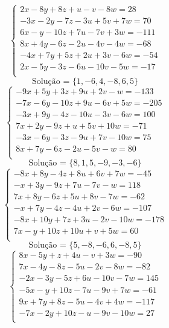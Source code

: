 \documentclass[12pt,oneside,a4paper]{article}
\begin{document}
\vspace{\baselineskip}
\begin{equation*}
\begin{cases}
2x-8y+8z+u-v-8w=28 \\
-3x-2y-7z-3u+5v+7w=70 \\
6x-y-10z+7u-7v+3w=-111 \\
8x+4y-6z-2u-4v-4w=-68 \\
-4x+7y+5z+2u+3v-6w=-54 \\
2x-5y-3z-6u-10v-5w=-17 \\
\end{cases}
\end{equation*}
\begin{equation*}
\text{Solução = }\{1,-6,4,-8,6,5\}
\end{equation*}
\vspace{\baselineskip}
\begin{equation*}
\begin{cases}
-9x+5y+3z+9u+2v-w=-133 \\
-7x-6y-10z+9u-6v+5w=-205 \\
-3x+9y-4z-10u-3v-6w=100 \\
7x+2y-9z+u+5v+10w=-71 \\
-3x-6y-3z-9u+7v-10w=75 \\
8x+7y-6z-2u-5v-w=80 \\
\end{cases}
\end{equation*}
\begin{equation*}
\text{Solução = }\{8,1,5,-9,-3,-6\}
\end{equation*}
\vspace{\baselineskip}
\begin{equation*}
\begin{cases}
-8x+8y-4z+8u+6v+7w=-45 \\
-x+3y-9z+7u-7v-w=118 \\
7x+8y-6z+5u+8v-7w=-62 \\
-x+7y-4z-4u+2v-6w=-107 \\
-8x+10y+7z+3u-2v-10w=-178 \\
7x-y+10z+10u+v+5w=60 \\
\end{cases}
\end{equation*}
\begin{equation*}
\text{Solução = }\{5,-8,-6,6,-8,5\}
\end{equation*}
\vspace{\baselineskip}
\begin{equation*}
\begin{cases}
8x-5y+z+4u-v+3w=-90 \\
7x-4y-8z-5u-2v-8w=-82 \\
-2x-3y-5z+6u-10v-7w=145 \\
-5x-y+10z-7u-9v+7w=-61 \\
9x+7y+8z-5u-4v+4w=-117 \\
-7x-2y+10z-u-9v-10w=27 \\
\end{cases}
\end{equation*}
\end{document}
